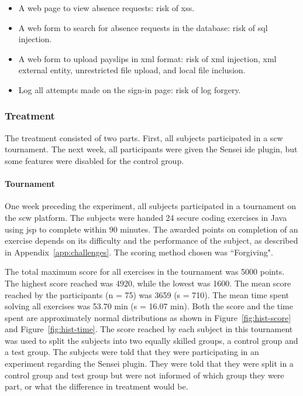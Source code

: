 \begin{itemize}[noitemsep]
    \item A web page to view absence requests: risk of \gls{xss}.
    \item A web form to search for absence requests in the database: risk of \gls{sql} injection.
    \item A web form to upload payslips in \gls{xml} format: risk of \gls{xml} injection, \gls{xml} external entity, unrestricted file upload, and local file inclusion.
    \item Log all attempts made on the sign-in page: risk of log forgery.
\end{itemize}

\subsubsection{Treatment}
The treatment consisted of two parts. First, all subjects participated in a \gls{scw} tournament.
The next week, all participants were given the Sensei \gls{ide} plugin, but some features were disabled for the control group.
\paragraph{Tournament}
One week preceding the experiment, all subjects participated in a tournament on the \gls{scw} platform.
The subjects were handed 24 secure coding exercises in Java using \gls{jsp} to complete within 90 minutes.
The awarded points on completion of an exercise depends on its difficulty and the performance of the subject, as described in Appendix~\ref{app:challenges}.
The scoring method chosen was ``Forgiving".

The total maximum score for all exercises in the tournament was 5000 points.
The highest score reached was 4920, while the lowest was 1600.
The mean score reached by the participants (n = 75) was 3659 (s = 710).
The mean time spent solving all exercises was 53.70 min (s = 16.07 min).
Both the score and the time spent are approximately normal distributions as shown in Figure~\ref{fig:hist-score} and Figure~\ref{fig:hist-time}.
The score reached by each subject in this tournament was used to split the subjects into two equally skilled groups, a control group and a test group.
The subjects were told that they were participating in an experiment regarding the Sensei plugin.
They were told that they were split in a control group and test group but were not informed of which group they were part, or what the difference in treatment would be. 

